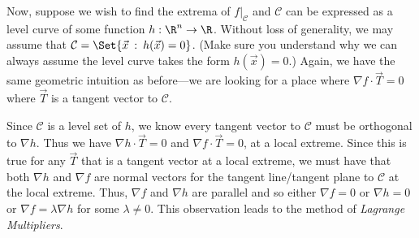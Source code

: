 Now, suppose we wish to find the extrema of $f\big|_{\mathcal C}$ and $\mathcal C$ can
be expressed as a level curve of some function $h:\R^n\to\R$.  Without loss of generality, we may
assume that $\mathcal C=\Set{\vec x\given h(\vec x)=0}$.  (Make sure you understand why
we can always assume the level curve takes the form $h(\vec x)=0$.)  Again, we have
the same geometric intuition as before---we are looking for a place where $\nabla f\cdot \vec T=0$
where $\vec T$ is a tangent vector to $\mathcal C$.  

Since $\mathcal C$ is a level set of $h$, we know every tangent vector to $\mathcal C$ must
be orthogonal to $\nabla h$.  Thus we have $\nabla h\cdot \vec T=0$ and $\nabla f\cdot \vec T=0$,
at a local extreme.  Since this is true for any $\vec T$ that is a tangent vector at a local extreme,
we must have that both $\nabla h$ and $\nabla f$ are normal vectors for the tangent line/tangent plane
to $\mathcal C$ at the local extreme.  Thus, $\nabla f$ and $\nabla h$ are parallel and so
either $\nabla f=0$ or $\nabla h=0$ or $\nabla f=\lambda \nabla h$ for some $\lambda\neq 0$.  This
observation leads to the method of \emph{Lagrange Multipliers}.


